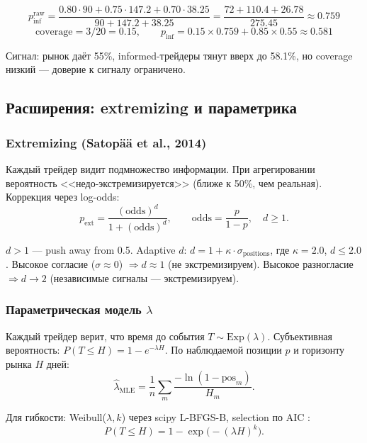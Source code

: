 \[
p_{\mathrm{inf}}^{\mathrm{raw}} = \frac{0.80 \cdot 90 + 0.75 \cdot 147.2 + 0.70 \cdot 38.25}{90 + 147.2 + 38.25}
= \frac{72 + 110.4 + 26.78}{275.45} \approx 0.759
\]
\[
\mathrm{coverage} = 3/20 = 0.15, \qquad
p_{\mathrm{inf}} = 0.15 \times 0.759 + 0.85 \times 0.55 \approx 0.581
\]

Сигнал: рынок даёт 55\%, informed-трейдеры тянут вверх до 58.1\%,
но coverage низкий --- доверие к сигналу ограничено.

\subsection{Расширения: extremizing и параметрика}

\subsubsection{Extremizing (Satop\"a\"a et al., 2014)}

Каждый трейдер видит подмножество информации.
При агрегировании вероятность <<недо-экстремизируется>> (ближе к 50\%, чем реальная).
Коррекция через log-odds:
\begin{equation}
\label{eq:extremize}
p_{\mathrm{ext}} = \frac{(\mathrm{odds})^d}{1 + (\mathrm{odds})^d}, \qquad
\mathrm{odds} = \frac{p}{1 - p}, \quad d \geq 1.
\end{equation}

$d > 1$ --- push away from 0.5.
Adaptive $d$: $d = 1 + \kappa \cdot \sigma_{\mathrm{positions}}$, где $\kappa = 2.0$, $d \leq 2.0$.
Высокое согласие ($\sigma \approx 0$) $\Rightarrow d \approx 1$ (не экстремизируем).
Высокое разногласие $\Rightarrow d \to 2$ (независимые сигналы --- экстремизируем).

\subsubsection{Параметрическая модель $\lambda$}

Каждый трейдер верит, что время до события $T \sim \mathrm{Exp}(\lambda)$.
Субъективная вероятность: $P(T \leq H) = 1 - e^{-\lambda H}$.
По наблюдаемой позиции $p$ и горизонту рынка $H$ дней:
\begin{equation}
\label{eq:lambda}
\hat{\lambda}_{\mathrm{MLE}} = \frac{1}{n} \sum_{m} \frac{-\ln(1 - \mathrm{pos}_m)}{H_m}.
\end{equation}

Для гибкости: Weibull($\lambda, k$) через scipy L-BFGS-B,
selection по AIC \citep{burnham2002model}:
\begin{equation}
\label{eq:weibull}
P(T \leq H) = 1 - \exp\!\bigl(-(\lambda H)^k\bigr).
\end{equation}

